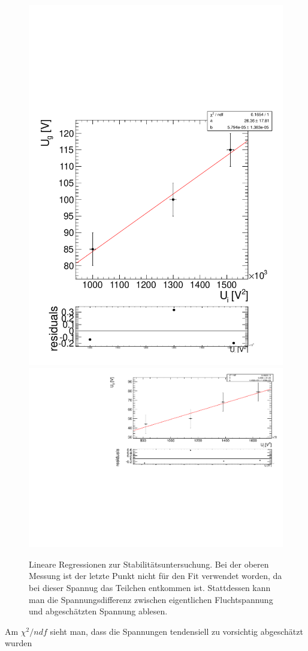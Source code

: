 \documentclass[a4paper,12pt]{article}
\begin{document}
\begin{figure}[htb]
		\includegraphics[height = 0.3\textheight]{../analyse/stabilitaet2.pdf}\\
		\includegraphics[height = 0.3\textheight]{../analyse/stabilitaet3.pdf}\\
		\caption{Lineare Regressionen zur Stabilitätsuntersuchung.
		Bei der oberen Messung ist der letzte Punkt nicht für den Fit verwendet worden, da bei dieser Spannug das Teilchen entkommen ist.
		Stattdessen kann man die Spannungsdifferenz zwischen eigentlichen Fluchtspannung und abgeschätzten Spannung ablesen.}
\end{figure}
Am $χ^2/ndf$ sieht man, dass die Spannungen tendensiell zu vorsichtig abgeschätzt wurden
\end{document}
